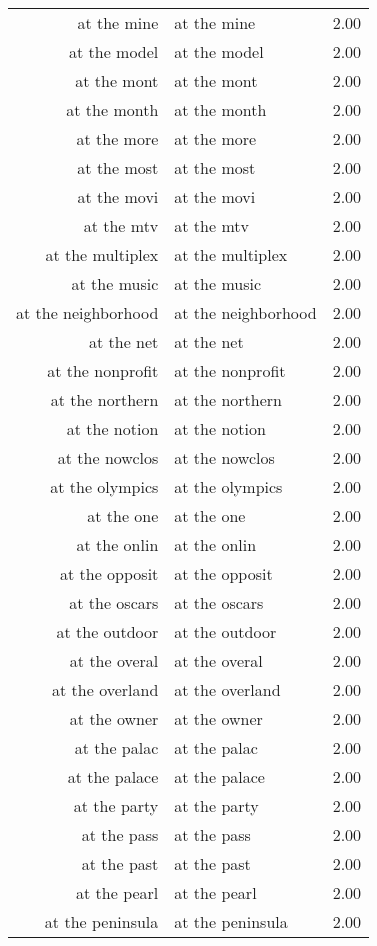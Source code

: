\begin{table}[ht]
\begin{tabular}{rlr}
  at the mine & at the mine & 2.00 \\ 
  at the model & at the model & 2.00 \\ 
  at the mont & at the mont & 2.00 \\ 
  at the month & at the month & 2.00 \\ 
  at the more & at the more & 2.00 \\ 
  at the most & at the most & 2.00 \\ 
  at the movi & at the movi & 2.00 \\ 
  at the mtv & at the mtv & 2.00 \\ 
  at the multiplex & at the multiplex & 2.00 \\ 
  at the music & at the music & 2.00 \\ 
  at the neighborhood & at the neighborhood & 2.00 \\ 
  at the net & at the net & 2.00 \\ 
  at the nonprofit & at the nonprofit & 2.00 \\ 
  at the northern & at the northern & 2.00 \\ 
  at the notion & at the notion & 2.00 \\ 
  at the nowclos & at the nowclos & 2.00 \\ 
  at the olympics & at the olympics & 2.00 \\ 
  at the one & at the one & 2.00 \\ 
  at the onlin & at the onlin & 2.00 \\ 
  at the opposit & at the opposit & 2.00 \\ 
  at the oscars & at the oscars & 2.00 \\ 
  at the outdoor & at the outdoor & 2.00 \\ 
  at the overal & at the overal & 2.00 \\ 
  at the overland & at the overland & 2.00 \\ 
  at the owner & at the owner & 2.00 \\ 
  at the palac & at the palac & 2.00 \\ 
  at the palace & at the palace & 2.00 \\ 
  at the party & at the party & 2.00 \\ 
  at the pass & at the pass & 2.00 \\ 
  at the past & at the past & 2.00 \\ 
  at the pearl & at the pearl & 2.00 \\ 
  at the peninsula & at the peninsula & 2.00 \\ 

\end{tabular}
\end{table}
